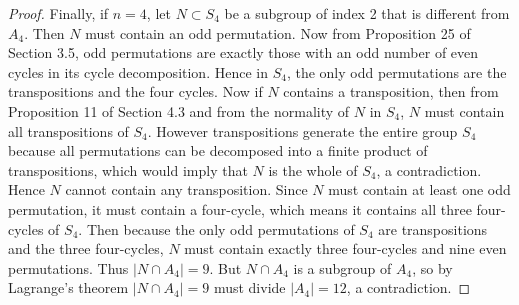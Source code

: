\begin{proof}
  Finally, if $n=4$, let $N\subset S_4$ be a subgroup of index 2 that is
  different from $A_4$. Then $N$ must contain an odd permutation. Now from
  Proposition 25 of Section 3.5, odd permutations are exactly those with an
  odd number of even cycles in its cycle decomposition. Hence in $S_4$, the
  only odd permutations are the transpositions and the four cycles. Now if
  $N$ contains a transposition, then from Proposition 11 of Section 4.3 and
  from the normality of $N$ in $S_4$, $N$ must contain all transpositions
  of $S_4$. However transpositions generate the entire group $S_4$ because
  all permutations can be decomposed into a finite product of
  transpositions, which would imply that $N$ is the whole of $S_4$, a
  contradiction. Hence $N$ cannot contain any transposition. Since $N$ must
  contain at least one odd permutation, it must contain a four-cycle, which
  means it contains all three four-cycles of $S_4$. Then because the only
  odd permutations of $S_4$ are transpositions and the three four-cycles,
  $N$ must contain exactly three four-cycles and nine even permutations.
  Thus $|N\cap A_4|=9$. But $N\cap A_4$ is a subgroup of $A_4$, so by
  Lagrange's theorem $|N\cap A_4|=9$ must divide $|A_4|=12$, a
  contradiction.

\end{proof}
